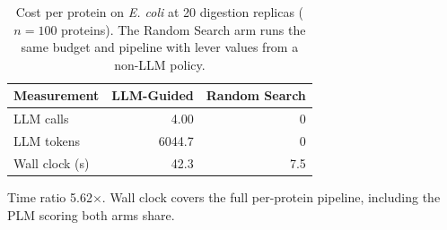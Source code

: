 \begin{table}[!tb]
  \centering
  \caption{Cost per protein on \textnormal{\textnormal{\textit{E. coli}}} at 20 digestion replicas ($n=100$ proteins). The Random Search arm runs the same budget and pipeline with lever values from a non-LLM policy.}
  \label{tab:cost_ecoli_r20}
  \begin{tabular}{lrr}
    \toprule
    Measurement & LLM-Guided & Random Search \\
    \midrule
    LLM calls & 4.00 & 0 \\
    LLM tokens & 6044.7 & 0 \\
    Wall clock (s) & 42.3 & 7.5 \\
    \bottomrule
  \end{tabular}
  \par\smallskip\footnotesize{Time ratio 5.62$\times$. Wall clock covers the full per-protein pipeline, including the PLM scoring both arms share.}
\end{table}

